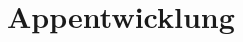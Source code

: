
\chapter{Appentwicklung}
\newpage
\null
\newpage
\null
\newpage
\null
\newpage
\null
\newpage
\null
